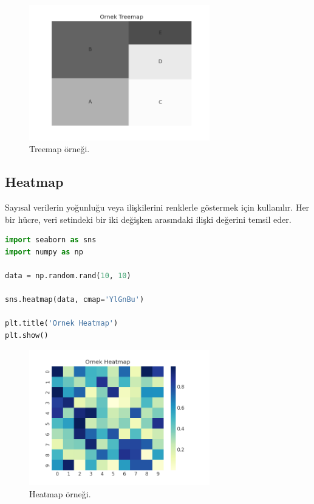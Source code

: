 \begin{figure}[h]
    \centering
    \includegraphics[width=0.7\textwidth]{images/treemap.png}
    \caption{Treemap örneği.}
    \label{fig:enter-label}
\end{figure}

\newpage

\subsection{Heatmap}
Sayısal verilerin yoğunluğu veya ilişkilerini renklerle göstermek için kullanılır. Her bir hücre, veri setindeki bir iki değişken arasındaki ilişki değerini temsil eder.

\begin{lstlisting}[language=Python]
import seaborn as sns
import numpy as np

data = np.random.rand(10, 10)

sns.heatmap(data, cmap='YlGnBu')

plt.title('Ornek Heatmap')
plt.show()
\end{lstlisting}

\begin{figure}[h]
    \centering
    \includegraphics[width=0.7\textwidth]{images/heatmap.png}
    \caption{Heatmap örneği.}
    \label{fig:enter-label}
\end{figure}


